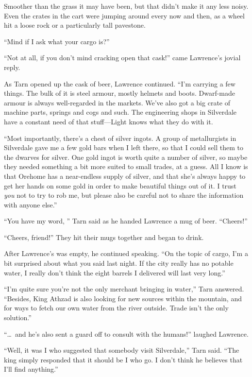 Smoother than the grass it may have been, but that didn't make it any less noisy.  Even the crates in the cart were jumping around every now and then, as a wheel hit a loose rock or a particularly tall pavestone.

``Mind if I ask what your cargo is?''

``Not at all, if you don't mind cracking open that cask!'' came Lawrence's jovial reply.

As Tarn opened up the cask of beer, Lawrence continued.  ``I'm carrying a few things.  The bulk of it is steel armour, mostly helmets and boots.  Dwarf-made armour is always well-regarded in the markets.  We've also got a big crate of machine parts, springs and cogs and such.  The engineering shops in Silverdale have a constant need of that stuff---Light knows what they do with it.

``Most importantly, there's a chest of silver ingots.  A group of metallurgists in Silverdale gave me a few gold bars when I left there, so that I could sell them to the dwarves for silver.  One gold ingot is worth quite a number of silver, so maybe they needed something a bit more suited to small trades, at a guess.  All I know is that Orehome has a near-endless supply of silver, and that she's always happy to get her hands on some gold in order to make beautiful things out of it.  I trust \emph{you} not to try to rob me, but please also be careful not to share the information with anyone else.''

``You have my word, '' Tarn said as he handed Lawrence a mug of beer.  ``Cheers!''

``Cheers, friend!''  They hit their mugs together and began to drink.

After Lawrence's was empty, he continued speaking.  ``On the topic of cargo, I'm a bit surprised about what you said last night.  If the city really has no potable water, I really don't think the eight barrels I delivered will last very long.''

``I'm quite sure you're not the only merchant bringing in water,'' Tarn answered.  ``Besides, King Athzad is also looking for new sources within the mountain, and for ways to fetch our own water from the river outside.  Trade isn't the only solution.''

``\ldots\ and he's also sent a guard off to consult with the humans!'' laughed Lawrence.

``Well, it was I who suggested that somebody visit Silverdale,'' Tarn said.  ``The king simply responded that it should be I who go.  I don't think he believes that I'll find anything.''

